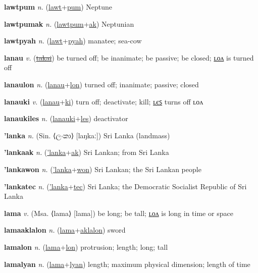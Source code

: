 \textbf{\hypertarget{lawtpum}{lawtpum}} \textit{n.} (\hyperlink{lawt}{lawt}+\allowbreak \hyperlink{pum}{pum})
Neptune

\textbf{\hypertarget{lawtpumak}{lawtpumak}} \textit{n.} (\hyperlink{lawtpum}{lawtpum}+\allowbreak \hyperlink{ak}{ak})
Neptunian

\textbf{\hypertarget{lawtpyah}{lawtpyah}} \textit{n.} (\hyperlink{lawt}{lawt}+\allowbreak \hyperlink{pyah}{pyah})
manatee; sea-cow

\textbf{\hypertarget{lanau}{lanau}} \textit{v.} (\hyperlink{takai}{\sout{takai}})
be turned off; be inanimate; be passive; be closed; \hyperlink{lanaulon}{ʟᴏᴧ} is turned off

\textbf{\hypertarget{lanaulon}{lanaulon}} \textit{n.} (\hyperlink{lanau}{lanau}+\allowbreak \hyperlink{lon}{lon})
turned off; inanimate; passive; closed

\textbf{\hypertarget{lanauki}{lanauki}} \textit{v.} (\hyperlink{lanau}{lanau}+\allowbreak \hyperlink{ki}{ki})
turn off; deactivate; kill; \hyperlink{lanaukiles}{ʟєꜱ} turns off ʟᴏᴧ

\textbf{\hypertarget{lanaukiles}{lanaukiles}} \textit{n.} (\hyperlink{lanauki}{lanauki}+\allowbreak \hyperlink{les}{les})
deactivator

\textbf{\hypertarget{'lanka}{'lanka}} \textit{n.} (Sin. ⟨{\sinhala{}ලංකා}⟩ [laŋkaː])
Sri Lanka (landmass)

\textbf{\hypertarget{'lankaak}{'lankaak}} \textit{n.} (\hyperlink{'lanka}{'lanka}+\allowbreak \hyperlink{ak}{ak})
Sri Lankan; from Sri Lanka

\textbf{\hypertarget{'lankawon}{'lankawon}} \textit{n.} (\hyperlink{'lanka}{'lanka}+\allowbreak \hyperlink{won}{won})
Sri Lankan; the Sri Lankan people

\textbf{\hypertarget{'lankatec}{'lankatec}} \textit{n.} (\hyperlink{'lanka}{'lanka}+\allowbreak \hyperlink{tec}{tec})
Sri Lanka; the Democratic Socialist Republic of Sri Lanka

\textbf{\hypertarget{lama}{lama}} \textit{v.} (Msa. ⟨lama⟩ [lama])
be long; be tall; \hyperlink{lamalon}{ʟᴏᴧ} is long in time or space

\textbf{\hypertarget{lamaaklalon}{lamaaklalon}} \textit{n.} (\hyperlink{lama}{lama}+\allowbreak \hyperlink{aklalon}{aklalon})
sword

\textbf{\hypertarget{lamalon}{lamalon}} \textit{n.} (\hyperlink{lama}{lama}+\allowbreak \hyperlink{lon}{lon})
protrusion; length; long; tall

\textbf{\hypertarget{lamalyan}{lamalyan}} \textit{n.} (\hyperlink{lama}{lama}+\allowbreak \hyperlink{lyan}{lyan})
length; maximum physical dimension; length of time

